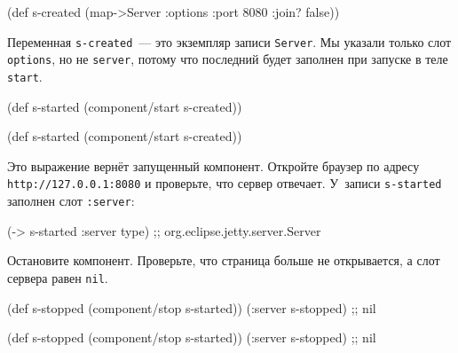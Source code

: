 \else

\begin{english}
  \begin{clojure}
(def s-created
  (map->Server {:options {:port 8080 :join? false}}))
  \end{clojure}
\end{english}

\fi

Переменная \verb|s-created|~--- это экземпляр записи \verb|Server|. Мы указали
только слот \verb|options|, но не \verb|server|, потому что последний будет
заполнен при запуске в теле \verb|start|.

\ifnarrow

\begin{english}
  \begin{clojure}
(def s-started
  (component/start s-created))
  \end{clojure}
\end{english}

\else

\begin{english}
  \begin{clojure}
(def s-started (component/start s-created))
  \end{clojure}
\end{english}

\fi

Это выражение вернёт запущенный компонент. Откройте браузер по адресу
\texttt{http://127.0.0.1\-:8080} и проверьте, что сервер отвечает. У~записи
\verb|s-started| заполнен слот \verb|:server|:

\begin{english}
  \begin{clojure}
(-> s-started :server type)
;; org.eclipse.jetty.server.Server
  \end{clojure}
\end{english}

Остановите компонент. Проверьте, что страница больше не открывается, а слот
сервера равен \verb|nil|.

\ifnarrow

\begin{english}
  \begin{clojure}
(def s-stopped
  (component/stop s-started))
(:server s-stopped) ;; nil
  \end{clojure}
\end{english}

\else

\begin{english}
  \begin{clojure}
(def s-stopped (component/stop s-started))
(:server s-stopped) ;; nil
  \end{clojure}
\end{english}

